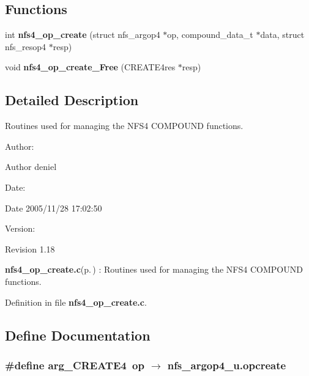 \subsection*{Functions}
\begin{CompactItemize}
\item 
int {\bf nfs4\_\-op\_\-create} (struct nfs\_\-argop4 $\ast$op, compound\_\-data\_\-t $\ast$data, struct nfs\_\-resop4 $\ast$resp)
\item 
void {\bf nfs4\_\-op\_\-create\_\-Free} (CREATE4res $\ast$resp)
\end{CompactItemize}


\subsection{Detailed Description}
Routines used for managing the NFS4 COMPOUND functions. 

\begin{Desc}
\item[Author:]\begin{Desc}
\item[Author]deniel \end{Desc}
\end{Desc}
\begin{Desc}
\item[Date:]\begin{Desc}
\item[Date]2005/11/28 17:02:50 \end{Desc}
\end{Desc}
\begin{Desc}
\item[Version:]\begin{Desc}
\item[Revision]1.18 \end{Desc}
\end{Desc}
{\bf nfs4\_\-op\_\-create.c}{\rm (p.\,\pageref{nfs4__op__create_8c})} : Routines used for managing the NFS4 COMPOUND functions.

Definition in file {\bf nfs4\_\-op\_\-create.c}.

\subsection{Define Documentation}
\subsubsection{\setlength{\rightskip}{0pt plus 5cm}\#define arg\_\-CREATE4\ op $\rightarrow$ nfs\_\-argop4\_\-u.opcreate}\label{nfs4__op__create_8c_a0}



